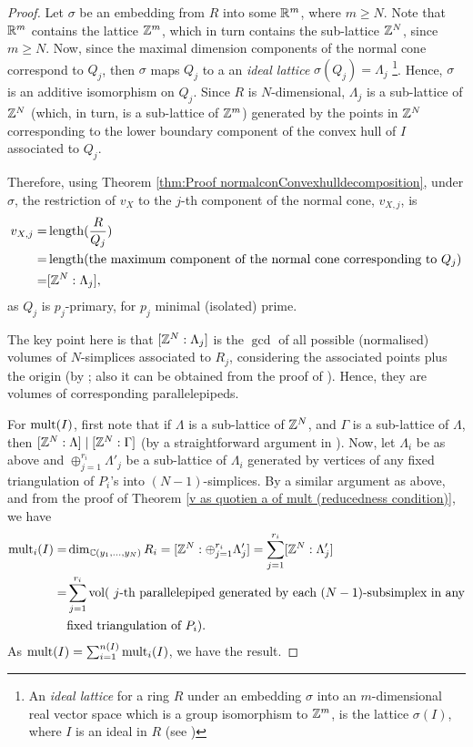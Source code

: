 \documentclass[11pt,a4paper,leqno,noamsfonts]{amsart}
\numberwithin{equation}{section}
\begin{document}
\begin{proof}
 
 Let $\sigma$ be an embedding from $R$ into some ${\mathbb{R}}^m$, where $m\geq N$. Note that ${\mathbb{R}}^m$ contains the lattice ${\mathbb{Z}}^m$, which in turn contains the sub-lattice ${\mathbb{Z}}^N$, since $m\geq N$. Now, since the maximal dimension components of the normal cone correspond to ${Q_j}$, then  $\sigma$ maps $Q_j$ to a an \textit{ideal lattice} $\sigma(Q_j)=\Lambda_j$ \footnote{An \textit{ideal lattice} for a ring $R$ under an
embedding $\sigma$ into an $m$-dimensional real vector space which is a group isomorphism to ${\mathbb{Z}}^m$, is the lattice $\sigma(I)$, where $I$  is an ideal in $R$ (see \cite[Section 1.3]{LPR})}.  Hence,  $\sigma$ is an additive isomorphism on $Q_j$. Since $R$ is $N$-dimensional,  $\Lambda_j$ is a sub-lattice of ${\mathbb{Z}}^N$ (which, in turn, is a sub-lattice of ${\mathbb{Z}}^m$) generated by the points in ${\mathbb{Z}}^N$ corresponding to the lower boundary component of the convex hull of $I$ associated to $Q_j$. 

 
Therefore, using Theorem \ref{thm:Proof normalconConvexhulldecomposition}, under $\sigma$, the restriction of $v_X$ to the $j$-th component of the normal cone, $v_{X,j}$, is
\begin{align*}
v_{X,j}=&\operatorname{length} (\frac{R}{Q_j})\\=&\operatorname{length}(\text{the maximum component of the normal cone corresponding to $Q_j$})\\=&[{\mathbb{Z}}^N:\Lambda_j],
 \end{align*}
as $Q_j$ is $p_j$-primary, for $p_j$ minimal (isolated) prime. 

The key point here is that $[{\mathbb{Z}}^N: \Lambda_j]$ is the $\gcd$ of all possible (normalised) volumes of $N$-simplices associated to $R_j$, considering the associated points plus the origin (by \cite[Lemma 2.4]{Blanco-Santos}; also it can be obtained from the proof of \cite[Theorem 2.2]{Stanley}). Hence, they are volumes of corresponding parallelepipeds. 


 
For $\mathrm{mult}(I)$, first note that if $\Lambda$ is a sub-lattice of ${\mathbb{Z}}^N$, and $\Gamma$ is a sub-lattice of $\Lambda$, then $[{\mathbb{Z}}^N:\Lambda]\mid[{\mathbb{Z}}^N:\Gamma]$  (by a straightforward argument in \cite[Lemma 2.3(1)]{Blanco-Santos}). Now, let $\Lambda_i$ be as above and $\oplus_{j=1}^{r_i}\Lambda'_{j}$ be a sub-lattice of $\Lambda_i$ generated by vertices of any fixed triangulation of $P_i$'s into $(N-1)$-simplices. By a similar argument as above, and from the proof of Theorem \ref{v as quotien a of mult (reducedness condition)}, we have
\begin{align*}
    \mathrm{mult}_i(I)=& \dim_{{\mathbb{C}}(y_1,\ldots,y_N)}R_i=[{\mathbb{Z}}^N:\oplus_{j=1}^{r_i}\Lambda'_{j}]=\sum_{j=1}^{r_i}[{\mathbb{Z}}^N:\Lambda'_{j}]\\
    =&\sum_{j=1}^{r_i}{\mathrm{vol}}(\text{ $j$-th parallelepiped generated by each $(N-1)$-subsimplex in any}\\&\text{fixed triangulation of $P_i$}).
\end{align*}
As $\mathrm{mult}(I)=\sum_{i=1}^{n(I)}\mathrm{mult}_i(I)$, we have the result. 


\end{proof}
\end{document}
